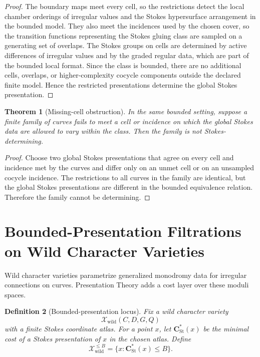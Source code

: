 \documentclass[11pt]{article}
\newtheorem{theorem}{Theorem}[section]
\newtheorem{definition}[theorem]{Definition}
\begin{document}
\begin{proof}
The boundary maps meet every cell, so the restrictions detect the local chamber orderings of irregular values and the Stokes hypersurface arrangement in the bounded model.  They also meet the incidences used by the chosen cover, so the transition functions representing the Stokes gluing class are sampled on a generating set of overlaps.  The Stokes groups on cells are determined by active differences of irregular values and by the graded regular data, which are part of the bounded local format.  Since the class is bounded, there are no additional cells, overlaps, or higher-complexity cocycle components outside the declared finite model.  Hence the restricted presentations determine the global Stokes presentation.
\end{proof}

\begin{theorem}[Missing-cell obstruction]
In the same bounded setting, suppose a finite family of curves fails to meet a cell or incidence on which the global Stokes data are allowed to vary within the class.  Then the family is not Stokes-determining.
\end{theorem}

\begin{proof}
Choose two global Stokes presentations that agree on every cell and incidence met by the curves and differ only on an unmet cell or on an unsampled cocycle incidence.  The restrictions to all curves in the family are identical, but the global Stokes presentations are different in the bounded equivalence relation.  Therefore the family cannot be determining.
\end{proof}

\section{Bounded-Presentation Filtrations on Wild Character Varieties}

Wild character varieties parametrize generalized monodromy data for irregular connections on curves.  Presentation Theory adds a cost layer over these moduli spaces.

\begin{definition}[Bounded-presentation locus]
Fix a wild character variety
\[
\mathcal X_{\operatorname{wild}}(C,D,G,Q)
\]
with a finite Stokes coordinate atlas.  For a point \(x\), let \(\mathbf C_{\operatorname{St}}^\ast(x)\) be the minimal cost of a Stokes presentation of \(x\) in the chosen atlas.  Define
\[
\mathcal X_{\operatorname{wild}}^{\le B}
=
\{x:\mathbf C_{\operatorname{St}}^\ast(x)\le B\}.
\]
\end{definition}
\end{document}
